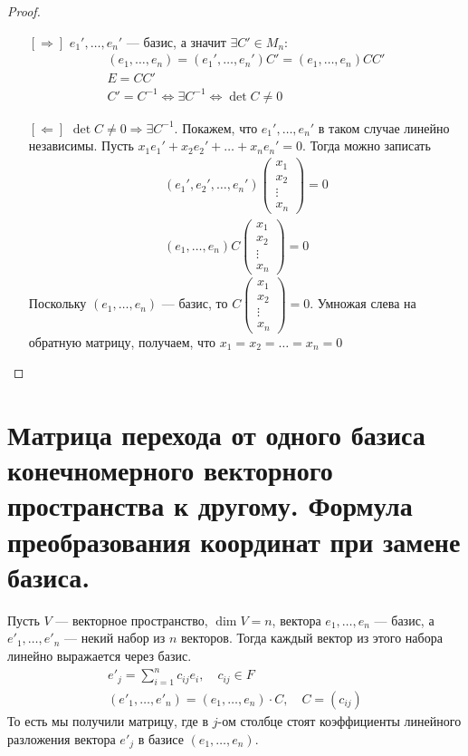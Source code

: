 \begin{proof} \ 
\begin{itemize}
\item[{$[\Rightarrow]$}] $e_1', \ldots, e_n'$ --- базис, а значит $\exists C' \in M_n \colon$
\begin{gather*}
\left(e_1, \ldots, e_n\right) = \left(e_1', \ldots, e_n'\right)C' = \left(e_1, \ldots, e_n\right)CC'\\
E = CC'\\
C' = C^{-1} \Leftrightarrow \exists C^{-1} \Leftrightarrow \det{C} \neq 0
\end{gather*}
\item[{$[\Leftarrow]$}] $\det C \neq 0 \Rightarrow \exists C^{-1}$. Покажем, что $e_1', \ldots, e_n'$ в таком случае линейно независимы. Пусть $x_1e_1' + x_2e_2' + \ldots + x_ne_n' = 0$. Тогда можно записать
\begin{gather*}
\left(e_1', e_2', \ldots, e_n'\right) 
\begin{pmatrix}
    x_1\\
    x_2\\
    \vdots\\
    x_n
\end{pmatrix} = 0\\
\left(e_1, \ldots, e_n\right)C\begin{pmatrix}
    x_1\\
    x_2\\
    \vdots\\
    x_n
\end{pmatrix} = 0
\end{gather*}
Поскольку $\left(e_1, \ldots, e_n\right)$ --- базис, то $C \begin{pmatrix}
    x_1\\
    x_2\\
    \vdots\\
    x_n
\end{pmatrix} = 0$. Умножая слева на обратную матрицу, получаем, что $x_1 = x_2 = \ldots = x_n = 0$
\end{itemize}
\end{proof}

\section{Матрица перехода от одного базиса конечномерного векторного пространства к другому. Формула преобразования координат при замене базиса.}

Пусть $V$ --- векторное пространство, $\dim V = n$, вектора $e_1, \ldots, e_n$ --- базис, а $e'_1, \ldots, e'_n$ --- некий набор из $n$ векторов. Тогда каждый вектор из этого набора линейно выражается через базис.
\begin{gather*}
e'_j = \sum_{i = 1}^{n} c_{ij}e_i, \quad c_{ij} \in F \\
(e'_1, \ldots, e'_n) = (e_1, \ldots, e_n) \cdot C, \quad C = (c_{ij})
\end{gather*}
То есть мы получили матрицу, где в $j$-ом столбце стоят коэффициенты линейного разложения вектора $e'_j$ в базисе $(e_1, \ldots, e_n)$.

